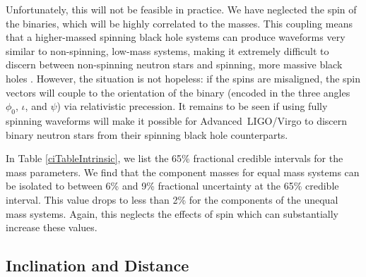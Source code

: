 \documentclass[11pt,a4paper]{emulateapj} 
\begin{document}
Unfortunately, this will not be feasible in practice.  We have
neglected the spin of the binaries, which will be highly correlated to
the masses.  This coupling means that a higher-massed spinning black
hole systems can produce waveforms very similar to non-spinning,
low-mass systems, making it extremely difficult to discern between
non-spinning neutron stars and spinning, more massive black holes
\citep{Baird2013,Hannam2013}.  However, the situation is not hopeless:
if the spins are misaligned, the spin vectors will couple to the
orientation of the binary (encoded in the three angles $\phi_0$,
$\iota$, and $\psi$) via relativistic precession.  It remains to be
seen if using fully spinning waveforms will make it possible for
Advanced\ LIGO/Virgo to discern binary neutron stars from their
spinning black hole counterparts.

In Table \ref{ciTableIntrinsic}, we list the 65\% fractional credible
intervals for the mass parameters.  We find that the component masses
for equal mass systems can be isolated to between 6\% and 9\%
fractional uncertainty at the 65\% credible interval.  This value
drops to less than 2\% for the components of the unequal mass systems.
Again, this neglects the effects of spin which can substantially
increase these values.


\subsection{Inclination and Distance}
\label{idSection}
\end{document}
